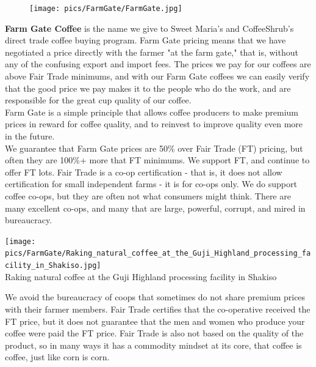 \documentclass[10pt,twoside,footinclude=true,headinclude=true]{scrbook} %
\begin{document}
\begin{figure}
  \vspace{-20pt}
  \begin{center}
    \texttt{[image: pics/FarmGate/FarmGate.jpg]}
  \end{center}
  \vspace{-20pt}
\end{figure}

\textbf{Farm Gate Coffee} is the name we give to Sweet Maria's and CoffeeShrub's direct trade coffee buying program. Farm Gate pricing means that we have negotiated a price directly with the farmer "at the farm gate," that is, without any of the confusing export and import fees. The prices we pay for our coffees are above Fair Trade minimums, and with our Farm Gate coffees we can easily verify that the good price we pay makes it to the people who do the work, and are responsible for the great cup quality of our coffee.\\
\medskip
Farm Gate is a simple principle that allows coffee producers to make premium prices in reward for coffee quality, and to reinvest to improve quality even more in the future.\\
\medskip
We guarantee that Farm Gate prices are 50\% over Fair Trade (FT) pricing, but often they are 100\%+ more that FT minimums. We support FT, and continue to offer FT lots. Fair Trade is a co-op certification - that is, it does not allow certification for small independent farms - it is for co-ops only. We do support coffee co-ops, but they are often not what consumers might think. There are many excellent co-ops, and many that are large, powerful, corrupt, and mired in bureaucracy.\\
\begin{center}
	\texttt{[image: pics/FarmGate/Raking\_natural\_coffee\_at\_the\_Guji\_Highland\_processing\_facility\_in\_Shakiso.jpg]} \\
	\scriptsize
	Raking natural coffee at the Guji Highland processing facility in Shakiso
\end{center}
We avoid the bureaucracy of coops that sometimes do not share premium prices with their farmer members. Fair Trade certifies that the co-operative received the FT price, but it does not guarantee that the men and women who produce your coffee were paid the FT price. Fair Trade is also not based on the quality of the product, so in many ways it has a commodity mindset at its core, that coffee is coffee, just like corn is corn.\\
\end{document}
